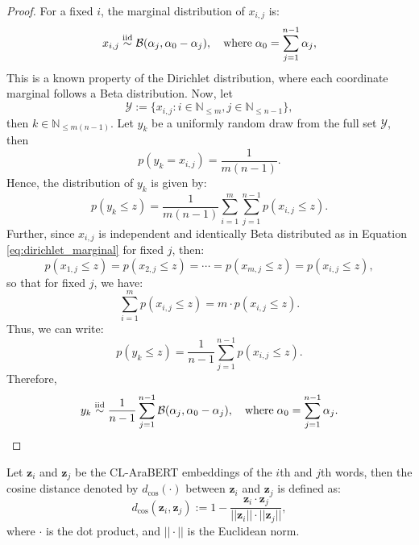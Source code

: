 \begin{proof}
    For a fixed $i$, the marginal distribution of $x_{i,j}$ is:
    \begin{equation}\label{eq:dirichlet_marginal}
        x_{i,j}\overset{\textnormal{iid}}{\sim}\mathcal{B}(\alpha_j,\alpha_0-\alpha_j),\quad\text{where}\;\alpha_0=\sum_{j=1}^{n-1}\alpha_j,
    \end{equation}
    This is a known property of the Dirichlet distribution, where each coordinate marginal follows a Beta distribution. Now, let 
    \begin{equation}
        \mathcal{Y}:=\{x_{i,j}:i\in\mathbb{N}_{\leq m}, j\in\mathbb{N}_{\leq n-1}\},
    \end{equation}
    then $k\in\mathbb{N}_{\leq m(n-1)}$. Let $y_k$ be a uniformly random draw from the full set $\mathcal{Y}$, then 
    \begin{equation}
        p(y_k=x_{i,j})=\frac{1}{m(n-1)}.
    \end{equation}
    Hence, the distribution of $y_k$ is given by:
    \begin{equation}
        p(y_k\leq z)=\frac{1}{m(n-1)}\sum_{i=1}^m\sum_{j=1}^{n-1}p(x_{i,j}\leq z).
    \end{equation}
    Further, since $x_{i,j}$ is independent and identically Beta distributed as in Equation \ref{eq:dirichlet_marginal} for fixed $j$, then:
    \begin{equation}
        p(x_{1,j}\leq z)=p(x_{2,j}\leq z)=\cdots=p(x_{m,j}\leq z)=p(x_{i,j}\leq z),
    \end{equation}
    so that for fixed $j$, we have:
    \begin{equation}
        \sum_{i=1}^m p(x_{i,j}\leq z)=m\cdot p(x_{i,j}\leq z).
    \end{equation}
    Thus, we can write:
    \begin{equation}
        p(y_k\leq z)=\frac{1}{n-1}\sum_{j=1}^{n-1}p(x_{i,j}\leq z).
    \end{equation}
    Therefore,
    \begin{equation}
        y_k\overset{\textnormal{iid}}{\sim}\frac{1}{n-1}\sum_{j=1}^{n-1}\mathcal{B}(\alpha_j,\alpha_0-\alpha_j),\quad\text{where}\;\alpha_0=\sum_{j=1}^{n-1}\alpha_j.
    \end{equation}
\end{proof}
\begin{defn}\label{defn:cosine_distance}
    Let $\mathbf{z}_i$ and $\mathbf{z}_j$ be the CL-AraBERT embeddings of the $i$th and $j$th words, then the cosine distance denoted by $d_{\cos}(\cdot)$ between $\mathbf{z}_i$ and $\mathbf{z}_j$ is defined as:
    \begin{equation}
        d_{\cos}(\mathbf{z}_i,\mathbf{z}_j):=1-\frac{\mathbf{z}_i\cdot\mathbf{z}_j}{||\mathbf{z}_i||\cdot||\mathbf{z}_j||},
    \end{equation}
    where $\cdot$ is the dot product, and $||\cdot||$ is the Euclidean norm.
\end{defn}
